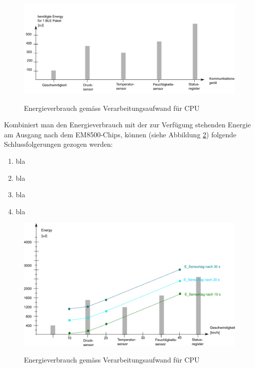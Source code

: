 \begin{figure}[ht]
\includegraphics[width=1\textwidth]{4Resultate/imag/EnergyVerbrauchNachKommunikation.png} \label{resultat_E_Verbrauch_Verarbeitungsaufwand} 
\caption{Energieverbrauch gemäss Verarbeitungsaufwand für CPU}
\end{figure}

Kombiniert man den Energieverbrauch mit der zur Verfügung stehenden Energie am Ausgang nach dem EM8500-Chips, können (siehe Abbildung \ref{resultat_Zsm_Energy}) folgende Schlussfolgerungen gezogen werden:

\begin{enumerate}
    \item bla
    \item bla
    \item bla
    \item bla
\end{enumerate}

\begin{figure}[ht]
\includegraphics[width=1\textwidth]{4Resultate/imag/EnergyVerbrauchZusammenfassung.png}\label{resultat_Zsm_Energy} 
\caption{Energieverbrauch gem\"{a}ss Verarbeitungsaufwand für CPU}
\end{figure}


